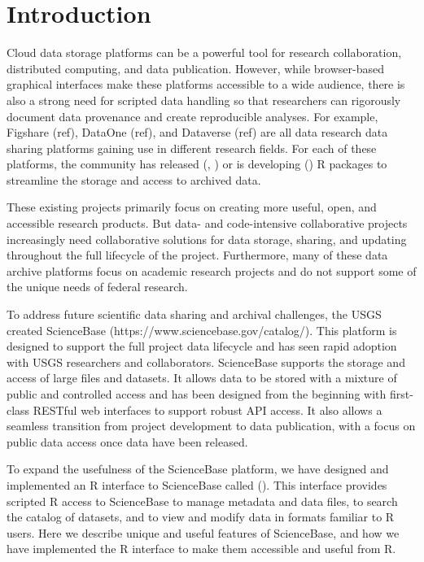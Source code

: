\section{Introduction}

Cloud data storage platforms can be a powerful tool for research collaboration,
distributed computing, and data publication. However, while browser-based graphical
interfaces make these platforms accessible to a wide audience, there is also
a strong need for scripted data handling so that researchers can rigorously
document data provenance and create reproducible analyses.
For example,
Figshare (ref), DataOne (ref), and Dataverse (ref) are all data research data
sharing platforms gaining use in different research fields. For each of these
platforms, the community has released (\cite{rfigshare}, \cite{dvn}) or is
developing (\cite{dataone}) R packages to streamline the storage and access
to archived data.

These existing projects primarily focus on creating more useful, open, and
accessible research products. But data- and code-intensive collaborative projects
increasingly need collaborative solutions for data storage, sharing, and updating
throughout the full lifecycle of the project. Furthermore, many of these data
archive platforms focus on academic research projects and do not support some
of the unique needs of federal research.

To address future scientific data sharing and archival challenges, the USGS
created ScienceBase (https://www.sciencebase.gov/catalog/). This platform is
designed to support
the full project data lifecycle and has seen rapid adoption with USGS
researchers and collaborators. ScienceBase supports the storage and access
of large files and datasets. It allows data to be stored with a mixture of
public and controlled access and has been designed from the beginning with
first-class RESTful web interfaces to support robust API access. It also allows
a seamless transition from project development to data publication, with
a focus on public data access once data have been released.

To expand the usefulness of the ScienceBase platform, we have designed and
implemented an R interface to ScienceBase called  (\cite{sbtools}).
This interface provides scripted R access to ScienceBase to manage metadata and
data files, to search the catalog of datasets, and to view and modify data in
formats familiar to R users.
Here we describe unique and useful features of ScienceBase, and how we have
implemented the R interface to make them accessible and useful from R.

